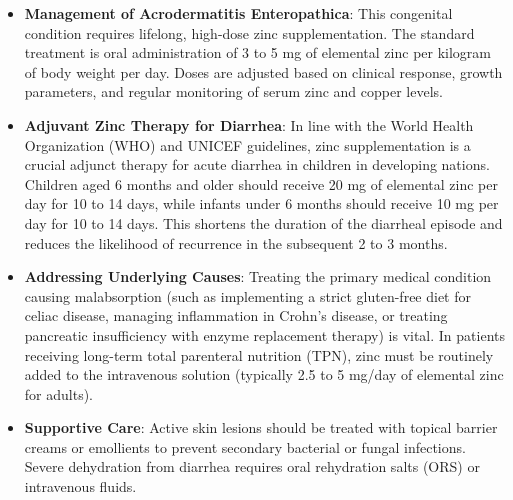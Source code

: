 \begin{itemize}
    \item \textbf{Management of Acrodermatitis Enteropathica}: This congenital condition requires lifelong, high-dose zinc supplementation. The standard treatment is oral administration of 3 to 5 mg of elemental zinc per kilogram of body weight per day. Doses are adjusted based on clinical response, growth parameters, and regular monitoring of serum zinc and copper levels.
    \item \textbf{Adjuvant Zinc Therapy for Diarrhea}: In line with the World Health Organization (WHO) and UNICEF guidelines, zinc supplementation is a crucial adjunct therapy for acute diarrhea in children in developing nations. Children aged 6 months and older should receive 20 mg of elemental zinc per day for 10 to 14 days, while infants under 6 months should receive 10 mg per day for 10 to 14 days. This shortens the duration of the diarrheal episode and reduces the likelihood of recurrence in the subsequent 2 to 3 months.
    \item \textbf{Addressing Underlying Causes}: Treating the primary medical condition causing malabsorption (such as implementing a strict gluten-free diet for celiac disease, managing inflammation in Crohn's disease, or treating pancreatic insufficiency with enzyme replacement therapy) is vital. In patients receiving long-term total parenteral nutrition (TPN), zinc must be routinely added to the intravenous solution (typically 2.5 to 5 mg/day of elemental zinc for adults).
    \item \textbf{Supportive Care}: Active skin lesions should be treated with topical barrier creams or emollients to prevent secondary bacterial or fungal infections. Severe dehydration from diarrhea requires oral rehydration salts (ORS) or intravenous fluids.
\end{itemize}


